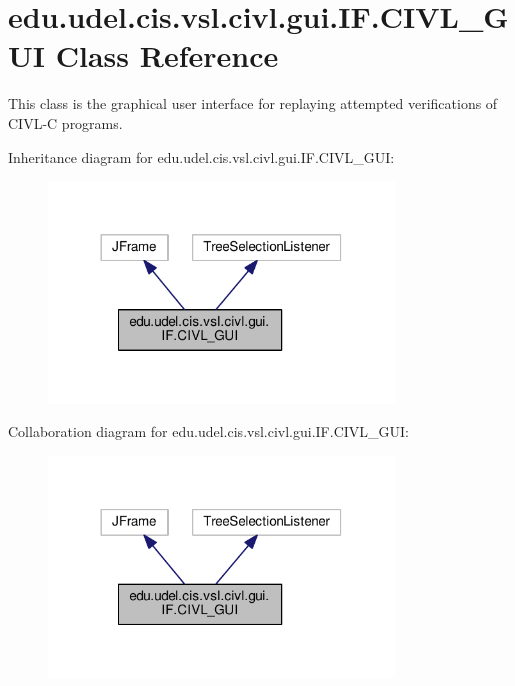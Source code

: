 \hypertarget{classedu_1_1udel_1_1cis_1_1vsl_1_1civl_1_1gui_1_1IF_1_1CIVL__GUI}{}\section{edu.\+udel.\+cis.\+vsl.\+civl.\+gui.\+I\+F.\+C\+I\+V\+L\+\_\+\+G\+U\+I Class Reference}
\label{classedu_1_1udel_1_1cis_1_1vsl_1_1civl_1_1gui_1_1IF_1_1CIVL__GUI}


This class is the graphical user interface for replaying attempted verifications of C\+I\+V\+L-\/\+C programs.  




Inheritance diagram for edu.\+udel.\+cis.\+vsl.\+civl.\+gui.\+I\+F.\+C\+I\+V\+L\+\_\+\+G\+U\+I\+:
\nopagebreak
\begin{figure}[H]
\begin{center}
\leavevmode
\includegraphics[width=260pt]{classedu_1_1udel_1_1cis_1_1vsl_1_1civl_1_1gui_1_1IF_1_1CIVL__GUI__inherit__graph}
\end{center}
\end{figure}


Collaboration diagram for edu.\+udel.\+cis.\+vsl.\+civl.\+gui.\+I\+F.\+C\+I\+V\+L\+\_\+\+G\+U\+I\+:
\nopagebreak
\begin{figure}[H]
\begin{center}
\leavevmode
\includegraphics[width=260pt]{classedu_1_1udel_1_1cis_1_1vsl_1_1civl_1_1gui_1_1IF_1_1CIVL__GUI__coll__graph}
\end{center}
\end{figure}
